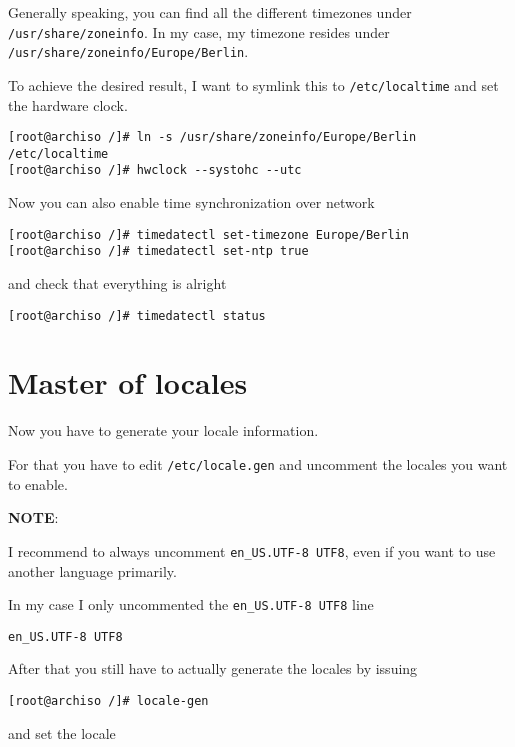 \documentclass[9pt]{report}
\newcommand{\admonition}[2]{\textbf{#1}: {#2}}
\begin{document}
Generally speaking, you can find all the different timezones under \texttt{/usr/share/zoneinfo}.
In my case, my timezone resides under \texttt{/usr/share/zoneinfo/Europe/Berlin}.


To achieve the desired result, I want to symlink this to \texttt{/etc/localtime} and set the hardware clock.


\begin{verbatim}
[root@archiso /]# ln -s /usr/share/zoneinfo/Europe/Berlin /etc/localtime
[root@archiso /]# hwclock --systohc --utc
\end{verbatim}

Now you can also enable time synchronization over network


\begin{verbatim}
[root@archiso /]# timedatectl set-timezone Europe/Berlin
[root@archiso /]# timedatectl set-ntp true
\end{verbatim}

and check that everything is alright


\begin{verbatim}
[root@archiso /]# timedatectl status
\end{verbatim}


\vfill\eject

\hypertarget{x-master-of-locales}{\section{Master of locales}}
Now you have to generate your locale information.


For that you have to edit \texttt{/etc/locale.gen} and uncomment the locales you want to enable.


\admonition{NOTE}{I recommend to always uncomment \texttt{en\_US.UTF-8 UTF8}, even if you want to use another language primarily.

}
In my case I only uncommented the \texttt{en\_US.UTF-8 UTF8} line


\begin{verbatim}
en_US.UTF-8 UTF8
\end{verbatim}

After that you still have to actually generate the locales by issuing


\begin{verbatim}
[root@archiso /]# locale-gen
\end{verbatim}

and set the locale
\end{document}
